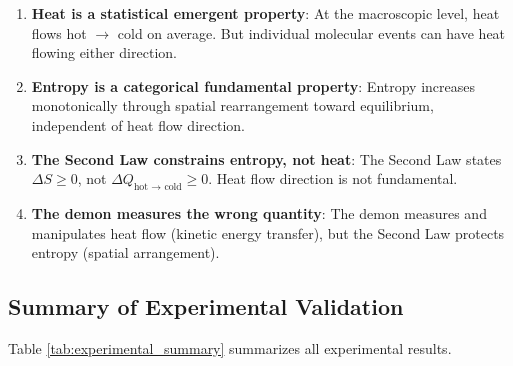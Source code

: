 \documentclass[10pt,twocolumn,letterpaper]{article}
\theoremstyle{definition}
\theoremstyle{remark}
\begin{document}
\begin{enumerate}
\item \textbf{Heat is a statistical emergent property}: At the macroscopic level, heat flows hot $\to$ cold on average. But individual molecular events can have heat flowing either direction.

\item \textbf{Entropy is a categorical fundamental property}: Entropy increases monotonically through spatial rearrangement toward equilibrium, independent of heat flow direction.

\item \textbf{The Second Law constrains entropy, not heat}: The Second Law states $\Delta S \geq 0$, not $\Delta Q_{\text{hot $\to$ cold}} \geq 0$. Heat flow direction is not fundamental.

\item \textbf{The demon measures the wrong quantity}: The demon measures and manipulates heat flow (kinetic energy transfer), but the Second Law protects entropy (spatial arrangement).
\end{enumerate}

\subsection{Summary of Experimental Validation}

Table \ref{tab:experimental_summary} summarizes all experimental results.
\end{document}
